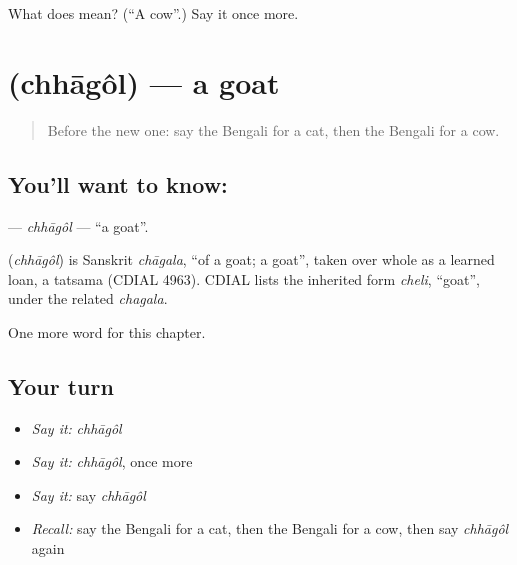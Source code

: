 \begin{tcolorbox}[breakable,colback=teal!4,colframe=teal!35!black,title={Before you move on}]
What does  mean? (\textquotedblleft{}A cow\textquotedblright{}.) Say it once more.
\end{tcolorbox}
\section[\texorpdfstring{\bn{ছাগল} (chhāgôl)}{ছাগল (chhāgôl)}]{ (chhāgôl) — a goat}

\label{lesson:BN-C69-chhagol}



\begin{quote}
Before the new one: say the Bengali for a cat, then the Bengali for a cow.
\end{quote}

\subsection*{You'll want to know: }
\textbf{} — \emph{chhāgôl} — \textquotedblleft{}a goat\textquotedblright{}.

\begin{cousinweb}
\textbf{} (\emph{chhāgôl}) is Sanskrit \emph{chāgala}, \textquotedblleft{}of a goat; a goat\textquotedblright{}, taken over whole as a learned loan, a tatsama (CDIAL 4963). CDIAL lists the inherited form \emph{cheli}, \textquotedblleft{}goat\textquotedblright{}, under the related \emph{chagala}.
\end{cousinweb}

\begin{grammarlens}[title={What you've built}]
One more word for this chapter.
\end{grammarlens}

\subsection*{Your turn}
\begin{itemize}
\raggedright
  \item \emph{Say it:} \emph{chhāgôl}
  \item \emph{Say it:} \emph{chhāgôl}, once more
  \item \emph{Say it:} say \emph{chhāgôl}
  \item \emph{Recall:} say the Bengali for a cat, then the Bengali for a cow, then say \emph{chhāgôl} again
\end{itemize}

